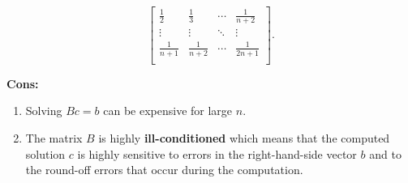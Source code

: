 \documentclass{report}
\begin{document}
\begin{itemize}
\begin{enumerate}
$$\begin{bmatrix}
                        \frac12 & \frac13 & \cdots & \frac{1}{n+2} \\
                        \vdots & \vdots & \ddots & \vdots \\
                        \frac{1}{n+1} & \frac{1}{n+2} & \cdots & \frac{1}{2n + 1}\\
                    \end{bmatrix}.
                    $$
            \end{enumerate}
            \textbf{Cons:}
            \begin{enumerate}
                \item Solving $B c = b$ can be expensive for large $n$.
                \item The matrix $B$ is highly \textbf{ill-conditioned} which means that the computed solution $c$ is highly sensitive to errors in the right-hand-side vector $b$ and to the round-off errors that occur during the computation.
            \end{enumerate}



     \end{itemize}















    
\end{document}
